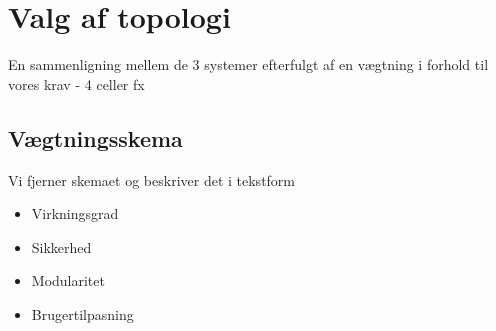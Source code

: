 \section{Valg af topologi}
En sammenligning mellem de 3 systemer efterfulgt af en vægtning i forhold til vores krav - 4 celler fx
\subsection{Vægtningsskema}
Vi fjerner skemaet og beskriver det i tekstform
\begin{itemize}
	\item Virkningsgrad
	\item Sikkerhed
	\item Modularitet
	\item Brugertilpasning
\end{itemize}